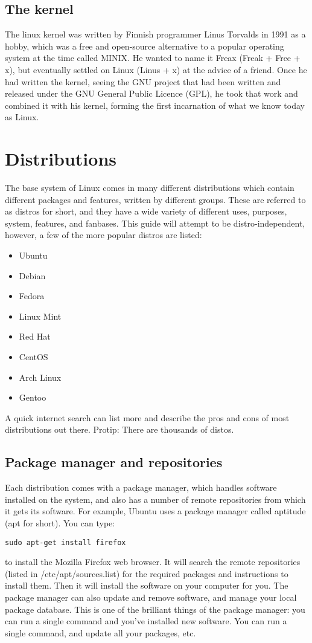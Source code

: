 \documentclass{article}
\begin{document}
\subsection{The kernel}
The linux kernel was written by Finnish programmer Linus Torvalds in 1991 as a hobby, which was a free and open-source alternative to a popular operating system at the time called MINIX. He wanted to name it Freax (Freak + Free + x), but eventually settled on Linux (Linus + x) at the advice of a friend. Once he had written the kernel, seeing the GNU project that had been written and released under the GNU General Public Licence (GPL), he took that work and combined it with his kernel, forming the first incarnation of what we know today as Linux.

\section{Distributions}
The base system of Linux comes in many different distributions which contain different packages and features, written by different groups. These are referred to as distros for short, and they have a wide variety of different uses, purposes, system, features, and fanbases.
This guide will attempt to be distro-independent, however, a few of the more popular distros are listed:
\begin{itemize}
\item Ubuntu
\item Debian
\item Fedora
\item Linux Mint
\item Red Hat
\item CentOS
\item Arch Linux
\item Gentoo
\end{itemize}
A quick internet search can list more and describe the pros and cons of most distributions out there. Protip: There are thousands of distos.

\subsection{Package manager and repositories}
Each distribution comes with a package manager, which handles software installed on the system, and also has a number of remote repositories from which it gets its software. For example, Ubuntu uses a package manager called aptitude (apt for short). You can type:
\begin{verbatim}
sudo apt-get install firefox
\end{verbatim}
to install the Mozilla Firefox web browser. It will search the remote repositories (listed in /etc/apt/sources.list) for the required packages and instructions to install them. Then it will install the software on your computer for you. The package manager can also update and remove software, and manage your local package database. This is one of the brilliant things of the package manager: you can run a single command and you've installed new software. You can run a single command, and update all your packages, etc.
\end{document}
